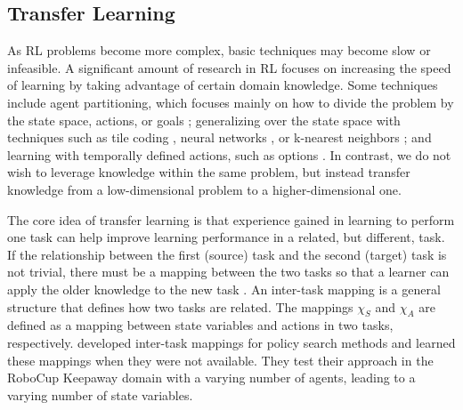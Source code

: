 \documentclass[10pt,a4paper]{article}
\begin{document}
\subsection{Transfer Learning}
As RL problems become more complex, basic techniques may become slow or infeasible. A significant amount of research in RL focuses on increasing the speed of learning by taking advantage of certain domain knowledge. Some techniques include agent partitioning, which focuses mainly on how to divide the problem by the state space, actions, or goals \cite{716791,Reddy_learninggoal-decomposition,Curran:2013:AHC:2484920.2485183}; generalizing over the state space with techniques such as tile coding \cite{whiteson:tr07}, neural networks \cite{Haykin:1998:NNC:521706}, or k-nearest neighbors \cite{tdknn}; and learning with temporally defined actions, such as options \cite{Sutton:1999:MSF:319103.319108}. In contrast, we do not wish to leverage knowledge within the same problem, but instead transfer knowledge from a low-dimensional problem to a higher-dimensional one. 
 
The core idea of transfer learning is that experience gained in learning to perform one task can help improve learning performance in a related, but different, task. If the relationship between the first (source) task and the second (target) task is not trivial, there must be a mapping between the two tasks so that a learner can apply the older knowledge to the new task \cite{Taylor:2009:TLR:1577069.1755839}. An inter-task mapping is a general structure that defines how two tasks are related. The mappings $\chi_S$ and $\chi_A$ are defined as a mapping between state variables and actions in two tasks, respectively. \citeauthor{AAMAS07-taylor}  developed inter-task mappings for policy search methods and learned these mappings when they were not available. They test their approach in the RoboCup Keepaway domain with a varying number of agents, leading to a varying number of state variables.


\end{document}
